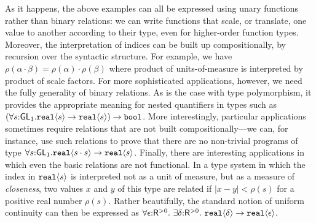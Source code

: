 \vspace*{0.1in}

As it happens, the above examples can all be expressed using unary
functions rather than binary relations: we can write functions that
scale, or translate, one value to another according to their type,
even for higher-order function types. Moreover, the interpretation of
indices can be built up compositionally, by recursion over the
syntactic structure. For example, we have $\rho(\alpha\cdot\beta) =
\rho(\alpha)\cdot\rho(\beta)$ where product of units-of-measure is
interpreted by product of scale factors. For more sophisticated
applications, however, we need the fully generality of binary
relations. As is the case with type polymorphism, it
provides the appropriate meaning for nested quantifiers in types such
as
$(\forall s\mathord:\mathsf{GL}_1.\textup{\texttt{real}}\langle s \rangle\to\textup{\texttt{real}}\langle s \rangle)\to\texttt{bool}$.
More interestingly, particular applications sometimes require
relations that are not built compositionally---we can, for instance,
use such relations to prove that there are no non-trivial programs of
type
$\forall s\mathord:\mathsf{GL}_1.\textup{\texttt{real}}\langle s\cdot s \rangle\to\textup{\texttt{real}}\langle s \rangle$.
Finally, there are interesting applications in which even the basic
relations are not functional. In a type system in which the index in
$\textup{\texttt{real}}\langle s \rangle$ is interpreted not as a unit of measure, but as
a measure of \emph{closeness}, two values $x$ and $y$ of this type are
related if $|x-y| < \rho(s)$ for a positive real number
$\rho(s)$.  Rather beautifully, the standard notion of uniform
continuity can then be expressed as %
 $ \forall \epsilon \mathord: \mathsf{R}^{>0}.\ \exists \delta\mathord: \mathsf{R}^{>0}.\ \tyPrim{real}{\delta} \to \tyPrim{real}{\epsilon}$.



